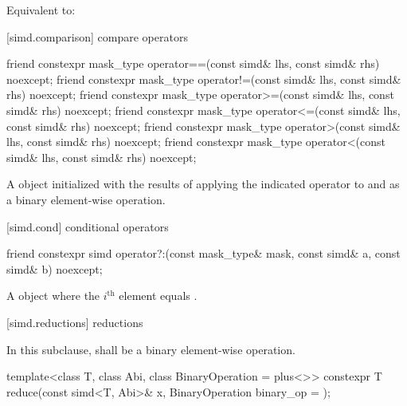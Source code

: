 \begin{itemdescr}
  \pnum\ConstraintOperatorTWellFormed

  \pnum\effects
  Equivalent to: 
\end{itemdescr}

[simd.comparison]{ compare operators}

\begin{itemdecl}
friend constexpr mask_type operator==(const simd& lhs, const simd& rhs) noexcept;
friend constexpr mask_type operator!=(const simd& lhs, const simd& rhs) noexcept;
friend constexpr mask_type operator>=(const simd& lhs, const simd& rhs) noexcept;
friend constexpr mask_type operator<=(const simd& lhs, const simd& rhs) noexcept;
friend constexpr mask_type operator>(const simd& lhs, const simd& rhs) noexcept;
friend constexpr mask_type operator<(const simd& lhs, const simd& rhs) noexcept;
\end{itemdecl}

\begin{itemdescr}
  \pnum\ConstraintOperatorTWellFormed

  \pnum\returns
  A  object initialized with the results of applying the indicated operator to  and  as a binary element-wise operation.
\end{itemdescr}

[simd.cond]{\texorpdfstring{}{simd} conditional operators}

\begin{itemdecl}
friend constexpr simd operator?:(const mask_type& mask, const simd& a, const simd& b) noexcept;
\end{itemdecl}

\begin{itemdescr}
  \pnum\returns
  A  object where the $i^\text{th}$ element equals  \foralli.
\end{itemdescr}
[simd.reductions]{\texorpdfstring{ r}{simd r}eductions}

\pnum
In this subclause,  shall be a binary element-wise operation.

\begin{itemdecl}
template<class T, class Abi, class BinaryOperation = plus<>>
  constexpr T reduce(const simd<T, Abi>& x, BinaryOperation binary_op = {});
\end{itemdecl}

